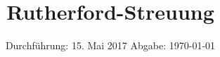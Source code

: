 
\subject{V16}
\title{Rutherford-Streuung}
\date{
  Durchführung: 15. Mai 2017
  \hspace{3em}
  Abgabe: \today
}



\maketitle
\newpage
\mbox{}
\newpage
\thispagestyle{empty}






\nocite{numpy}
\nocite{matplotlib}
\nocite{uncertainties}
\printbibliography


